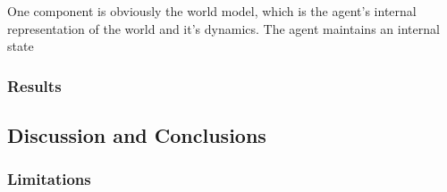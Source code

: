 One component is obviously the world model, which is the agent's internal representation of the world and it's dynamics. The agent maintains an internal state
\subsubsection{Results}

\subsection{Discussion and Conclusions}
\subsubsection{Limitations}
